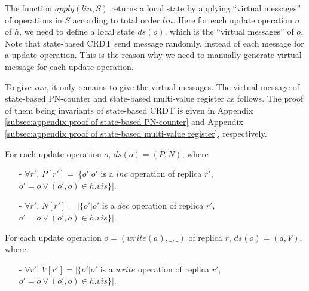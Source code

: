 The function $\mathit{apply}(\mathit{lin},S)$ returns a local state by applying ``virtual messages'' of operations in $S$ according to total order $\mathit{lin}$. Here for each update operation $o$ of $h$, we need to define a local state $\mathit{ds}(o)$, which is the ``virtual messages'' of $o$. Note that state-based CRDT send message randomly, instead of each message for a update operation. This is the reason why we need to manually generate virtual message for each update operation. 

To give $\mathit{inv}$, it only remains to give the virtual messages. The virtual message of state-based PN-counter and state-based multi-value register as follows. The proof of them being invariants of state-based CRDT is given in Appendix \ref{subsec:appendix proof of state-based PN-counter} and Appendix \ref{subsec:appendix proof of state-based multi-value register}, respectively.

\begin{example}
\label{example:virtual messagess of state-based PN-counter}

For each update operation $o$, $\mathit{ds}(o) = (P,N)$, where

\begin{itemize}
\setlength{\itemsep}{0.5pt}
\item[-] $\forall r'$, $P[r'] = \vert \{ o' \vert o'$ is a $\mathit{inc}$ operation of replica $r'$, $o' = o \vee (o',o) \in h.\mathit{vis} \} \vert$.

\item[-] $\forall r'$, $N[r'] = \vert \{ o' \vert o'$ is a $\mathit{dec}$ operation of replica $r'$, $o' = o \vee (o',o) \in h.\mathit{vis} \} \vert$.
\end{itemize}
\end{example}

\begin{example}
\label{example:virtual messages of state-based multi-value register}

For each update operation $o = (\mathit{write}(a),\_,\_)$ of replica $r$, $\mathit{ds}(o) = (a,V)$, where

\begin{itemize}
\setlength{\itemsep}{0.5pt}
\item[-] $\forall r'$, $V[r'] = \vert \{ o' \vert o'$ is a $\mathit{write}$ operation of replica $r'$, $o' = o \vee (o',o) \in h.\mathit{vis} \} \vert$.
\end{itemize}
\end{example}









